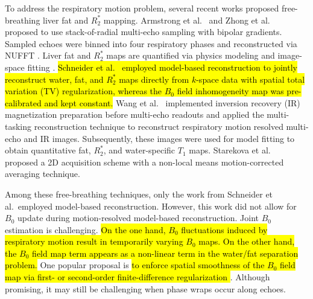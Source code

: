 \documentclass[journal,twoside,web]{ieeecolor}
\begin{document}
To address the respiratory motion problem, 
several recent works proposed free-breathing liver fat and $R_2^*$ mapping. 
Armstrong et al.~\cite{armstrong_2018_fat} and 
Zhong et al.~\cite{zhong_2020_r2sclinic,zhong_2020_resr2s} 
proposed to use stack-of-radial multi-echo sampling with bipolar gradients. 
Sampled echoes were binned into four respiratory phases 
and reconstructed via NUFFT \cite{fessler_2003_nufft}. 
Liver fat and $R_2^*$ maps are quantified 
via physics modeling \cite{yu_2007_t2sideal,yu_2008_mft2sideal,chebrolu_2010_indiwf} 
and image-space fitting \cite{reeder_2005_ideal,hernando_2010_gc,zhong_2014_wfadafit}. 
\hl{Schneider et al.~\mbox{\cite{schneider_2020_mobawfr2s}} 
employed model-based reconstruction 
\mbox{\cite{block_2009_mobat2,fessler_2010_moba,doneva_2010_mobawf}} 
to jointly reconstruct water, fat, and $R_2^*$ maps directly from $k$-space data 
with spatial total variation (TV) regularization, 
whereas the $B_0$ field inhomogeneity map was pre-calibrated \mbox{\cite{hernando_2010_gc}} 
and kept constant. } 
Wang et al.~\cite{wang_2022_mt-me} implemented 
inversion recovery (IR) magnetization preparation before multi-echo readouts 
and applied the multi-tasking reconstruction technique \cite{christodoulou_2018_mt} 
to reconstruct respiratory motion resolved multi-echo and IR images. 
Subsequently, these images were used for model fitting \cite{hernando_2010_gc} 
to obtain quantitative fat, $R_2^*$, and water-specific $T_1$ maps. 
Starekova et al.~\cite{starekova_2022_fb-fat} proposed a 2D acquisition scheme 
with a non-local means \cite{buades_2005_nlm} motion-corrected averaging technique. 

Among these free-breathing techniques, only the work from Schneider et al.~employed 
model-based reconstruction. However, this work did not allow for $B_0$ update during 
motion-resolved model-based reconstruction. Joint $B_0$ estimation is challenging. 
\hl{On the one hand, $B_0$ fluctuations induced by respiratory motion 
	result in temporarily varying $B_0$ maps. 
	On the other hand, the $B_0$ field map term appears as a non-linear term 
	in the water/fat separation problem.} 
One popular proposal is \hl{to enforce spatial smoothness of the $B_0$ field map 
	via first- or second-order finite-difference regularization 
	\mbox{\cite{sutton_2004_dynamicfield,olafsson_2008_joint,funai_2008_secondorder}}}. 
Although promising, it may still be challenging when phase wraps occur along echoes. 


\marginnote[R2.13]
\end{document}
